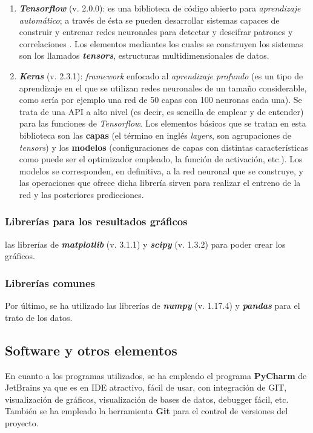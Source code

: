 \begin{enumerate}
    \item \textbf{\textit{Tensorflow}} (v. 2.0.0): es una biblioteca de código abierto para \textit{aprendizaje automático}; a través de ésta se pueden desarrollar sistemas capaces de construir y entrenar redes neuronales para detectar y descifrar patrones y correlaciones \cite{tensorflowWikipedia}. Los elementos mediantes los cuales se construyen los sistemas son los llamados \textit{\textbf{tensors}}, estructuras multidimensionales de datos. 
    \item \textbf{\textit{Keras}} (v. 2.3.1): \textit{framework} enfocado al \textit{aprendizaje profundo} (es un tipo de aprendizaje en el que se utilizan redes neuronales de un tamaño considerable, como sería por ejemplo una red de 50 capas con 100 neuronas cada una). Se trata de una API a alto nivel (es decir, es sencilla de emplear y de entender) para las funciones de \textit{Tensorflow}. Los elementos básicos que se tratan en esta biblioteca son las \textbf{capas} (el término en inglés \textit{layers}, son agrupaciones de \textit{tensors}) y los \textbf{modelos} (configuraciones de capas con distintas características como puede ser el optimizador empleado, la función de activación, etc.). Los modelos se corresponden, en definitiva, a la red neuronal que se construye, y las operaciones que ofrece dicha librería sirven para realizar el entreno de la red y las posteriores predicciones. 
   
\end{enumerate}

\subsubsection{Librerías para los resultados gráficos}

las librerías de \textbf{\textit{matplotlib}} (v. 3.1.1) y \textit{\textbf{scipy}} (v. 1.3.2) para poder crear los gráficos. 

\subsubsection{Librerías comunes}

Por último, se ha utilizado las librerías de \textbf{\textit{numpy}} (v. 1.17.4) y \textbf{\textit{pandas}} para el trato de los datos. 

\subsection{Software y otros elementos} 

En cuanto a los programas utilizados, se ha empleado el programa \textbf{PyCharm} de JetBrains ya que es en IDE atractivo, fácil de usar, con integración de GIT, visualización de gráficos, visualización de bases de datos, debugger fácil, etc. \\

También se ha empleado la herramienta \textbf{Git} para el control de versiones del proyecto. 
